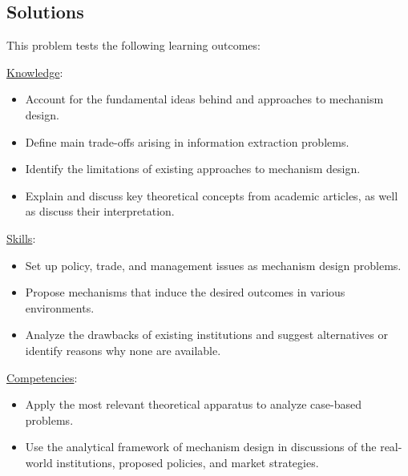 \documentclass[a4paper]{article}
\newif\ifsolutions
\begin{document}
\ifsolutions
\subsection*{Solutions}
	This problem tests the following learning outcomes:
	\begin{framed}
		\underline{Knowledge}:
		\begin{itemize}[$\circ$]
			\item {Account for the fundamental ideas behind and approaches to mechanism design.}
			\item {Define main trade-offs arising in information extraction problems.}
			\item {Identify the limitations of existing approaches to mechanism design.}
			\item {Explain and discuss key theoretical concepts from academic articles, as well as discuss their interpretation.}
		\end{itemize}
		\underline{Skills}:
		\begin{itemize}[$\circ$]
			\item {Set up policy, trade, and management issues as mechanism design problems.}
			\item {Propose mechanisms that induce the desired outcomes in various environments.}
			\item {Analyze the drawbacks of existing institutions and suggest alternatives or identify reasons why none are available.}
		\end{itemize}
		\underline{Competencies}:
		\begin{itemize}[$\circ$]
			\item {Apply the most relevant theoretical apparatus to analyze case-based problems.}
			\item {Use the analytical framework of mechanism design in discussions of the real-world institutions, proposed policies, and market strategies.}
		\end{itemize}
	\end{framed}
\end{document}
